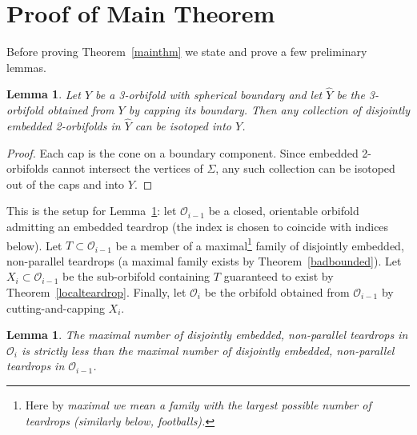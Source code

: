 \documentclass[12pt,reqno]{amsart}
\theoremstyle{plain}
\theoremstyle{definition}
\numberwithin{subcase}{case}
\theoremstyle{plain}
\newtheorem{lemm}[thm]{Lemma}
\theoremstyle{definition}
\newcommand{\OO}{\mathcal{O}}
\begin{document}
\section{Proof of Main Theorem}\label{sec:Proof of Main Theorem}

Before proving Theorem~\ref{mainthm} we state and prove a few preliminary lemmas.

\begin{lemm}
Let $Y$ be a 3-orbifold with spherical boundary and let $\hat{Y}$ be the 3-orbifold obtained from \(Y\) by capping its boundary. Then any collection of disjointly embedded 2-orbifolds in $\hat{Y}$ can be isotoped into $Y$.
\label{lemma:IsotopingIntoXi}
\end{lemm}

\begin{proof}
Each cap is the cone on a boundary component.
Since embedded 2-orbifolds cannot intersect the vertices of $\Sigma$, any such collection can be isotoped out of the caps and into \(Y\).
\end{proof}

This is the setup for Lemma~\ref{lemma:FewerTeardrops}: let $\OO_{i-1}$ be a closed, orientable orbifold admitting an embedded teardrop (the index is chosen to coincide with indices below).  Let $T\subset \OO_{i-1}$ be  a member of a maximal\footnote{Here by \em maximal \em we mean a family with the largest possible number of teardrops (similarly below, footballs).}  
 family of disjointly embedded, non-parallel teardrops (a maximal family exists by Theorem~\ref{badbounded}). Let \(X_{i} \subset \OO_{i-1}\) be the sub-orbifold containing \(T\) guaranteed to exist by Theorem~\ref{localteardrop}.  Finally, let \(\OO_{i}\) be the orbifold obtained from \(\OO_{i-1}\) by cutting-and-capping \(X_{i}\).

\begin{lemm}
The maximal number of disjointly embedded, non-parallel teardrops in $\OO_i$ is strictly less than the maximal number of disjointly embedded, non-parallel teardrops in $\OO_{i-1}$.
\label{lemma:FewerTeardrops}
\end{lemm}
\end{document}

